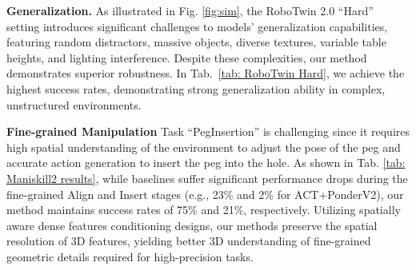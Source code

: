 \documentclass[runningheads]{llncs}
\begin{document}
\noindent \textbf{Generalization. } As illustrated in Fig. \ref{fig:sim}, the RoboTwin 2.0 ``Hard'' setting introduces significant challenges to models' generalization capabilities, featuring random distractors, massive objects, diverse textures, variable table heights, and lighting interference. Despite these complexities, our method demonstrates superior robustness. In Tab.~\ref{tab: RoboTwin Hard}, we achieve the highest success rates, demonstrating strong generalization ability in complex, unstructured environments.


\noindent \textbf{Fine-grained Manipulation} Task ``PegInsertion'' is challenging since it requires high spatial understanding of the environment to adjust the pose of the peg and accurate action generation to insert the peg into the hole. As shown in Tab. \ref{tab: Maniskill2 results}, while baselines suffer significant performance drops during the fine-grained Align and Insert stages (e.g., 23\% and 2\% for ACT+PonderV2), our method maintains success rates of 75\% and 21\%, respectively. Utilizing spatially aware dense features conditioning designs, our methods preserve the spatial resolution of 3D features, yielding better 3D understanding of fine-grained geometric details required for high-precision tasks.
\end{document}
